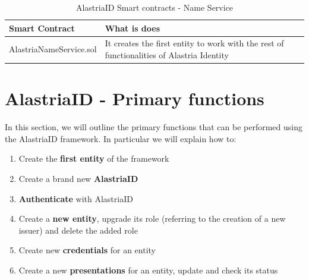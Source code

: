 \documentclass[target=mst,aauheader=]{thud}
\begin{document}
\begin{table}[h!]
    \begin{tabular}{|p{6cm}|p{12cm}|}
    \hline
    Smart Contract & What is does\\ [0.5ex] 
    \hline\hline
    AlastriaNameService.sol	 & It creates the first entity to work with the rest of functionalities of Alastria Identity \\ 
    \hline
    \end{tabular}
    \caption{AlastriaID Smart contracts - Name Service}
    \label{table:nameService}


\end{table}

\section{AlastriaID - Primary functions}

In this section, we will outline the primary functions that can be performed using the AlastriaID framework.
In particular we will explain how to:

\begin{enumerate}

    \item Create the \textbf{first entity} of the framework
    \item Create a brand new \textbf{AlastriaID}
    \item \textbf{Authenticate} with AlastriaID
    \item Create a \textbf{new entity}, upgrade its role (referring to the creation of a new issuer) and delete the added role
    \item Create new \textbf{credentials} for an entity
    \item Create a new \textbf{presentations} for an entity, update and check its status

\end{enumerate}
\end{document}
